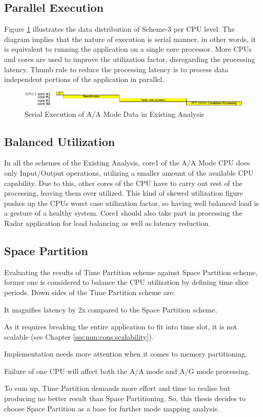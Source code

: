 \subsection{Parallel Execution}
Figure \ref{fig:mm:aa_serial_exe} illustrates the data distribution of Scheme-3 per CPU level. The diagram implies that the nature of execution is serial manner, in other words, it is equivalent to running the application on a single core processor. More CPUs and cores are used to improve the utilization factor, disregarding the processing latency. Thumb rule to reduce the processing latency is to process data independent portions of the application in parallel. 

\begin{figure}[h!]
	\centering
	\includegraphics[width=160mm]{figures/aa_serial_exe}
	\caption{Serial Execution of A/A Mode Data in Existing Analysis}
	\label{fig:mm:aa_serial_exe}
\end{figure}

\subsection{Balanced Utilization}
In all the schemes of the Existing Analysis, core1 of the A/A Mode CPU does only Input/Output operations, utilizing a smaller amount of the available CPU capability. Due to this, other cores of the CPU have to carry out rest of the processing, leaving them over utilized. This kind of skewed utilization figure pushes up the CPUs worst case utilization factor, so having well balanced load is a gesture of a healthy system. Core1 should also take part in processing the Radar application for load balancing as well as latency reduction. \vspace*{0.2cm}

\subsection{Space Partition}
Evaluating the results of Time Partition scheme against Space Partition scheme, former one is considered to balance the CPU utilization by defining time slice periods. Down sides of the Time Partition scheme are:
\begin{compactitem} 
\item It magnifies latency by 2x compared to the Space Partition scheme.
\item As it requires breaking the entire application to fit into time slot, it is not scalable (see Chapter \ref{sss:mm:cons:scalability}).
\item Implementation needs more attention when it comes to memory partitioning.
\item Failure of one CPU will affect both the A/A mode and A/G mode processing.
\end{compactitem} 
\vspace*{0.2cm}
To sum up, Time Partition demands more effort and time to realise but producing no better result than Space Partitioning. So, this thesis decides to choose Space Partition as a base for further mode mapping analysis.

